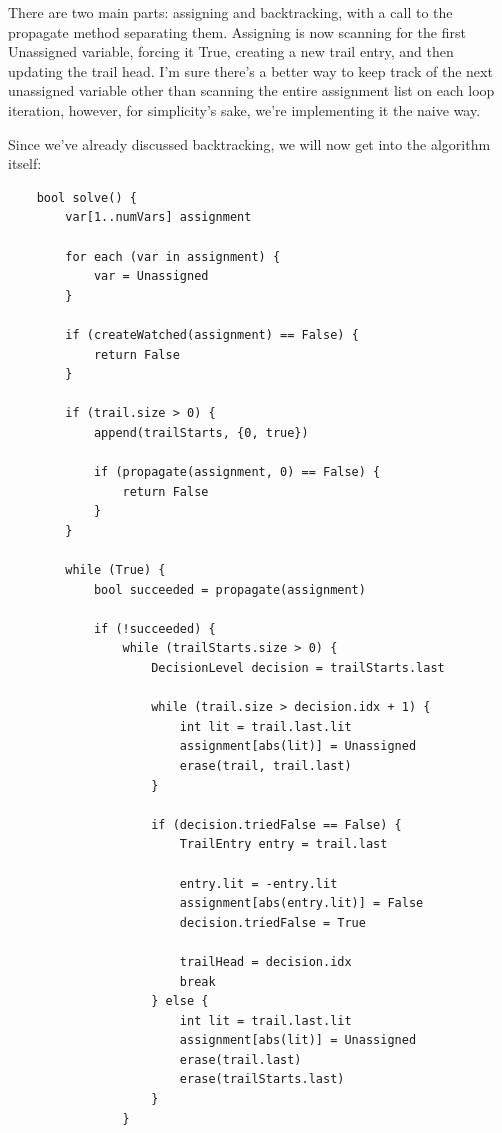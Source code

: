 \documentclass[oneside]{book}
\begin{document}
There are two main parts: assigning and backtracking, with a call to the propagate 
method separating them. Assigning is now scanning for the first Unassigned variable,
forcing it True, creating a new trail entry, and then updating the trail head. I'm 
sure there's a better way to keep track of the next unassigned variable other than 
scanning the entire assignment list on each loop iteration, however, for simplicity's 
sake, we're implementing it the naive way. 

Since we've already discussed backtracking, we will now get into the algorithm 
itself:

\begin{lstlisting}
    bool solve() {
        var[1..numVars] assignment

        for each (var in assignment) {
            var = Unassigned
        }

        if (createWatched(assignment) == False) {
            return False
        }

        if (trail.size > 0) {
            append(trailStarts, {0, true})

            if (propagate(assignment, 0) == False) {
                return False
            }
        }

        while (True) {
            bool succeeded = propagate(assignment)

            if (!succeeded) {
                while (trailStarts.size > 0) {
                    DecisionLevel decision = trailStarts.last

                    while (trail.size > decision.idx + 1) {
                        int lit = trail.last.lit
                        assignment[abs(lit)] = Unassigned
                        erase(trail, trail.last)
                    }

                    if (decision.triedFalse == False) {
                        TrailEntry entry = trail.last

                        entry.lit = -entry.lit
                        assignment[abs(entry.lit)] = False
                        decision.triedFalse = True

                        trailHead = decision.idx
                        break
                    } else {
                        int lit = trail.last.lit
                        assignment[abs(lit)] = Unassigned
                        erase(trail.last)
                        erase(trailStarts.last)
                    }
                }


\end{lstlisting}
\end{document}

